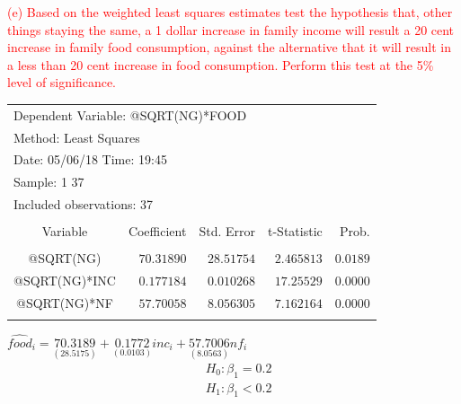 \documentclass[12pt]{report}
\begin{document}
\noindent \textcolor{red}
{
	(e) Based on the weighted least squares estimates test the hypothesis that, other things staying the same, a 1 dollar increase in family income will result a 20 cent increase in family food consumption, against the alternative that it will result in a less than 20 cent increase in food consumption. Perform this test at the 5\% level of significance.
}
\begin{table}[H]
	\centering
	\begin{tabular}{lrrrr}
		\multicolumn{4}{l}{Dependent Variable: @SQRT(NG)*FOOD}&\multicolumn{1}{c}{}\\
		\multicolumn{3}{l}{Method: Least Squares}&\multicolumn{1}{c}{}&\multicolumn{1}{c}{}\\
		\multicolumn{3}{l}{Date: 05/06/18   Time: 19:45}&\multicolumn{1}{c}{}&\multicolumn{1}{c}{}\\
		\multicolumn{2}{l}{Sample: 1 37}&\multicolumn{1}{c}{}&\multicolumn{1}{c}{}&\multicolumn{1}{c}{}\\
		\multicolumn{3}{l}{Included observations: 37}&\multicolumn{1}{c}{}&\multicolumn{1}{c}{}\\
		[4.5pt] \hline \\ [-4.5pt]
		\multicolumn{1}{c}{Variable}&\multicolumn{1}{r}{Coefficient}&\multicolumn{1}{r}{Std. Error}&\multicolumn{1}{r}{t-Statistic}&\multicolumn{1}{r}{Prob.}\\
		[4.5pt] \hline \\ [-4.5pt]
		\multicolumn{1}{c}{@SQRT(NG)}&\multicolumn{1}{r}{$70.31890$}&\multicolumn{1}{r}{$28.51754$}&\multicolumn{1}{r}{$2.465813$}&\multicolumn{1}{r}{$0.0189$}\\
		\multicolumn{1}{c}{@SQRT(NG)*INC}&\multicolumn{1}{r}{$0.177184$}&\multicolumn{1}{r}{$0.010268$}&\multicolumn{1}{r}{$17.25529$}&\multicolumn{1}{r}{$0.0000$}\\
		\multicolumn{1}{c}{@SQRT(NG)*NF}&\multicolumn{1}{r}{$57.70058$}&\multicolumn{1}{r}{$8.056305$}&\multicolumn{1}{r}{$7.162164$}&\multicolumn{1}{r}{$0.0000$}\\
		[4.5pt] \hline \\ [-4.5pt]
	\end{tabular}
\end{table}
\centering $\widehat{food}_i = \underset{(28.5175)}{70.3189} + \underset{(0.0103)}{0.1772}inc_i + \underset{(8.0563)}{57.7006}nf_i$
\begin{align*}
&H_0: \beta_1 = 0.2 \\
&H_1: \beta_1 < 0.2
\end{align*}
\end{document}
